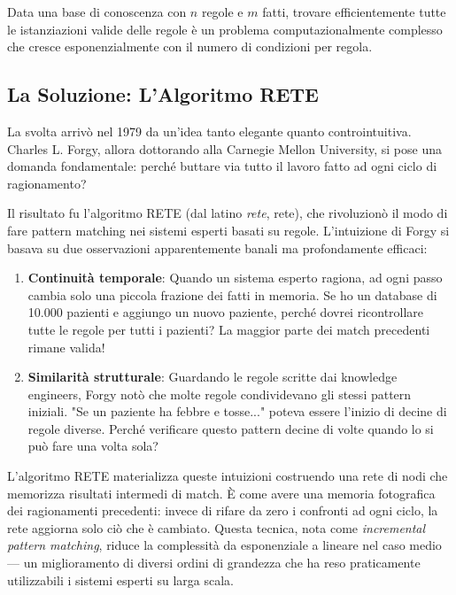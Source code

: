 \begin{infobox}
Data una base di conoscenza con $n$ regole e $m$ fatti, trovare efficientemente tutte le istanziazioni valide delle regole è un problema computazionalmente complesso che cresce esponenzialmente con il numero di condizioni per regola.
\end{infobox}

\subsection{La Soluzione: L'Algoritmo RETE}

La svolta arrivò nel 1979 da un'idea tanto elegante quanto controintuitiva. Charles L. Forgy, allora dottorando alla Carnegie Mellon University, si pose una domanda fondamentale: perché buttare via tutto il lavoro fatto ad ogni ciclo di ragionamento? 

Il risultato fu l'algoritmo RETE (dal latino \textit{rete}, rete), che rivoluzionò il modo di fare pattern matching nei sistemi esperti basati su regole. L'intuizione di Forgy si basava su due osservazioni apparentemente banali ma profondamente efficaci:

\begin{enumerate}
\item \textbf{Continuità temporale}: Quando un sistema esperto ragiona, ad ogni passo cambia solo una piccola frazione dei fatti in memoria. Se ho un database di 10.000 pazienti e aggiungo un nuovo paziente, perché dovrei ricontrollare tutte le regole per tutti i pazienti? La maggior parte dei match precedenti rimane valida!

\item \textbf{Similarità strutturale}: Guardando le regole scritte dai knowledge engineers, Forgy notò che molte regole condividevano gli stessi pattern iniziali. "Se un paziente ha febbre e tosse..." poteva essere l'inizio di decine di regole diverse. Perché verificare questo pattern decine di volte quando lo si può fare una volta sola?
\end{enumerate}

L'algoritmo RETE materializza queste intuizioni costruendo una rete di nodi che memorizza risultati intermedi di match. È come avere una memoria fotografica dei ragionamenti precedenti: invece di rifare da zero i confronti ad ogni ciclo, la rete aggiorna solo ciò che è cambiato. Questa tecnica, nota come \textit{incremental pattern matching}, riduce la complessità da esponenziale a lineare nel caso medio — un miglioramento di diversi ordini di grandezza che ha reso praticamente utilizzabili i sistemi esperti su larga scala.

